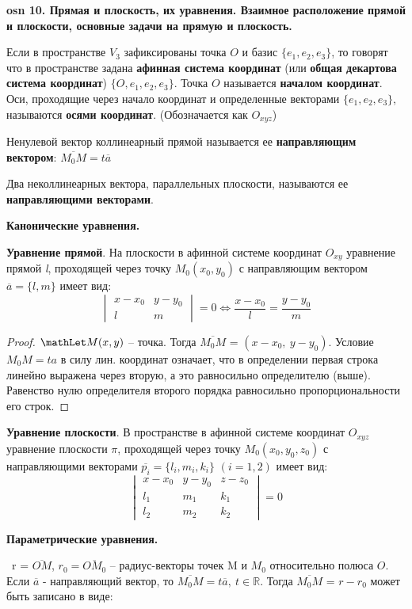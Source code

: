\textbf{\LARGE osn 10. Прямая и плоскость, их уравнения. Взаимное расположение прямой и плоскости,  основные задачи на прямую и плоскость.}

Если в пространстве $V_3$ зафиксированы точка $O$ и базис $\{e_1, e_2, e_3\}$, то говорят что в пространстве задана \textbf{афинная система координат} (или \textbf{общая декартова система координат}) $\{O, e_1, e_2, e_3\}$. Точка $O$ называется \textbf{началом координат}. Оси, проходящие через начало координат и определенные векторами $\{e_1, e_2, e_3\}$, называются \textbf{осями координат}. (Обозначается как $O_{xyz}$)

Ненулевой вектор коллинеарный прямой называется ее \textbf{направляющим вектором}: $\overline{M_0M} = t \overline{a}$   

Два неколлинеарных вектора, параллельных плоскости, называются ее \textbf{направляющими векторами}. 


\bigbreak
\centerline{\textbf{Канонические уравнения.}}

\textbf{Уравнение прямой}. На плоскости в афинной системе координат $O_{xy}$ уравнение прямой \textit{l}, проходящей через точку $M_0(x_0,y_0)$ с направляющим вектором $\overline{a}=\{l,m\}$ имеет вид:
$$\begin{vmatrix} x-x_0 & y-y_0 \\ l & m \end{vmatrix} = 0 \iff \frac{x-x_0}{l} = \frac{y-y_0}{m} $$
\begin{proof}
$\mathLet M(x,y)$ -- точка. Тогда $\overline{M_0M}$ = $(x - x_0, ~ y - y_0)$. Условие $M_0M = ta$ в силу лин. координат означает, что в определении первая строка линейно выражена через вторую, а это равносильно определителю (выше). Равенство нулю определителя второго порядка равносильно пропорциональности его строк.
\end{proof}


\textbf{Уравнение плоскости}. 
В пространстве в афинной системе координат $O_{xyz}$ уравнение плоскости $\pi$, проходящей через точку $M_0(x_0,y_0,z_0)$ с направляющими векторами $\overline{p_i}=\{l_i,m_i,k_i\}$ $(i=1,2)$ имеет вид:
$$\begin{vmatrix} x-x_0 & y-y_0 & z-z_0\\ l_1 & m_1 & k_1 \\ l_2 & m_2 & k_2 \end{vmatrix} = 0 $$

\bigbreak
\centerline{\textbf{Параметрические уравнения.}}

\mathLet \ r = $\overline{OM}$, $r_0 = \overline{OM_0}$ -- радиус-векторы точек M и $M_0$ относительно полюса $O$. Если $\overline{a}$ - направляющий вектор, то $\overline{M_0M} = t\overline{a},~t\in\mathbb{R}$. Тогда $\overline{M_0M}$ = $r-r_0$ может быть записано в виде:

